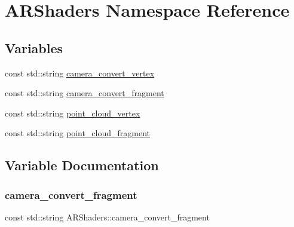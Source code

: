 \hypertarget{namespace_a_r_shaders}{}\section{A\+R\+Shaders Namespace Reference}
\label{namespace_a_r_shaders}
\subsection*{Variables}
\begin{DoxyCompactItemize}
\item 
const std\+::string \hyperlink{namespace_a_r_shaders_a3c22292f0a3f936dec68c88539ff258b}{camera\+\_\+convert\+\_\+vertex}
\item 
const std\+::string \hyperlink{namespace_a_r_shaders_a7ad85c6ac56fd64d97461423e022c3ef}{camera\+\_\+convert\+\_\+fragment}
\item 
const std\+::string \hyperlink{namespace_a_r_shaders_ada1162901271506088cc985d466c8971}{point\+\_\+cloud\+\_\+vertex}
\item 
const std\+::string \hyperlink{namespace_a_r_shaders_ad415abff7a73d38ae981dd4be29a7076}{point\+\_\+cloud\+\_\+fragment}
\end{DoxyCompactItemize}


\subsection{Variable Documentation}
\mbox{\label{namespace_a_r_shaders_a7ad85c6ac56fd64d97461423e022c3ef}} 
\subsubsection{\texorpdfstring{camera\+\_\+convert\+\_\+fragment}{camera\_convert\_fragment}}
{\footnotesize\ttfamily const std\+::string A\+R\+Shaders\+::camera\+\_\+convert\+\_\+fragment}

\mbox{\label{namespace_a_r_shaders_a3c22292f0a3f936dec68c88539ff258b}} 
